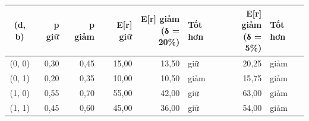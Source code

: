 \begin{tabular}{crrrrlrl}
\toprule
(d, b) & p giữ & p giảm & E[r] giữ & \makecell[r]{E[r] giảm\\(δ = 20\%)} & Tốt hơn & \makecell[r]{E[r] giảm\\(δ = 5\%)} & Tốt hơn \\
\midrule
(0, 0) & 0{,}30 & 0{,}45 & 15{,}00 & 13{,}50 & giữ & 20{,}25 & giảm \\
(0, 1) & 0{,}20 & 0{,}35 & 10{,}00 & 10{,}50 & giảm & 15{,}75 & giảm \\
(1, 0) & 0{,}55 & 0{,}70 & 55{,}00 & 42{,}00 & giữ & 63{,}00 & giảm \\
(1, 1) & 0{,}45 & 0{,}60 & 45{,}00 & 36{,}00 & giữ & 54{,}00 & giảm \\
\bottomrule
\end{tabular}
